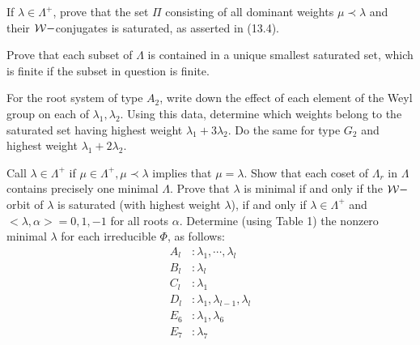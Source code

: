 \begin{ex}
  If $\lambda\in \Lambda^{+}$, prove that the set $\Pi$ consisting of all dominant weights $\mu\prec\lambda$ and their ${\cal W}-$conjugates is saturated, as asserted in (13.4).
\end{ex}

\begin{ex}
  Prove that each subset of $\Lambda$ is contained in a unique smallest saturated set, which is finite if the subset in question is finite.
\end{ex}

\begin{ex}
  For the root system of type $A_2$, write down the effect of each element of the Weyl group on each of $\lambda_1, \lambda_2$. Using this data, determine which weights belong to the saturated set having highest weight $\lambda_1 + 3\lambda_2$. Do the same for type $G_2$ and highest weight $\lambda_1 + 2\lambda_2$.
\end{ex}

\begin{ex}
  Call $\lambda \in \Lambda^{+}$  if $\mu \in \Lambda^{+}, \mu\prec \lambda$ implies that $\mu = \lambda$. Show that each coset of $\Lambda_r$ in $\Lambda$ contains precisely one minimal $\Lambda$. Prove that $\lambda$ is minimal if and only if the ${\cal W}-$orbit of $\lambda$ is saturated (with highest weight $\lambda$), if and only if $\lambda \in \Lambda^{+}$ and $< \lambda, \alpha >= 0, 1, -1$ for all roots $\alpha$. Determine (using Table 1) the nonzero minimal $\lambda$ for each irreducible $\Phi$, as follows:
  \begin{align*}
    A_l &\colon\lambda_1, \cdots , \lambda_l \\
    B_l &\colon\lambda_l \\
    C_l &\colon\lambda_1 \\
    D_l &\colon\lambda_1, \lambda_{l-1}, \lambda_l \\
    E_6 &\colon\lambda_1, \lambda_6 \\
    E_7 &\colon\lambda_7
  \end{align*}
\end{ex}
